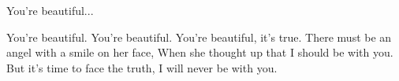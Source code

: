 \documentclass[../../../songbook.tex]{subfiles}
\begin{document}
\-\hspace{1cm} You're beautiful...	\newline

You're beautiful. You're beautiful.				 \newline	
You're beautiful, it's true.					 \newline	
There must be an angel with a smile on her face, \newline	
When she thought up that I should be with you.	 \newline	
But it's time to face the truth,				 \newline	
I will never be with you. 						 \newline	
\end{document}
